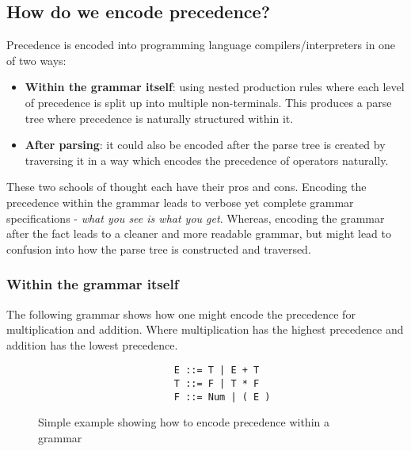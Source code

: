 \documentclass[12pt, letterpaper]{article}
\theoremstyle{definition}
\begin{document}
\subsection{How do we encode precedence?}

Precedence is encoded into programming language compilers/interpreters in one of two ways:

\begin{itemize}
    \item \textbf{Within the grammar itself}: using nested production rules where each level of precedence is split up into multiple non-terminals. This produces a parse tree where precedence is naturally structured within it.
    \item \textbf{After parsing}: it could also be encoded after the parse tree is created by traversing it in a way which encodes the precedence of operators naturally.
\end{itemize}

These two schools of thought each have their pros and cons. Encoding the precedence within the grammar leads to verbose yet complete grammar specifications - \textit{what you see is what you get}. Whereas, encoding the grammar after the fact leads to a cleaner and more readable grammar, but might lead to confusion into how the parse tree is constructed and traversed.

\subsubsection{Within the grammar itself}

The following grammar shows how one might encode the precedence for multiplication and addition. Where multiplication has the highest precedence and addition has the lowest precedence.

\begin{figure}[H]
    \begin{center}
        \begin{verbatim}            
                        E ::= T | E + T
                        T ::= F | T * F
                        F ::= Num | ( E )
        \end{verbatim}
    \end{center}
    \vspace{-1.5em}
    \caption{\label{fig:4.5}Simple example showing how to encode precedence within a grammar}
\end{figure}
\end{document}
